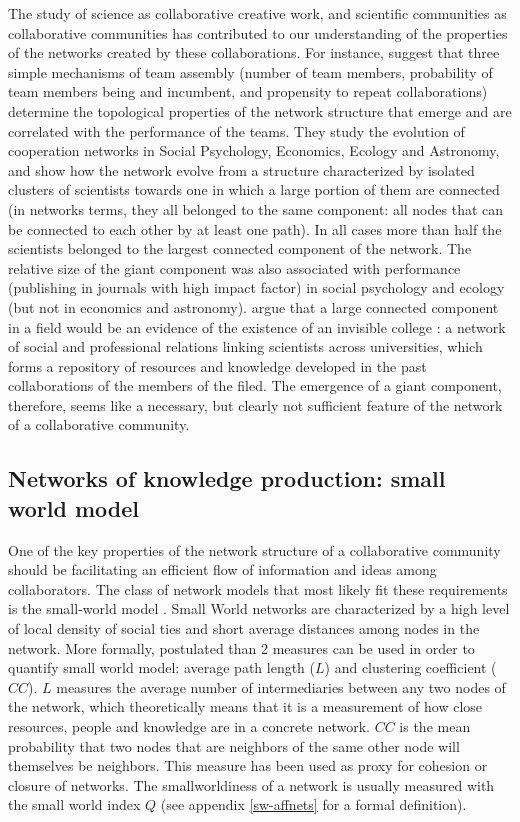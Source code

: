 The study of science as collaborative creative work, and scientific communities as collaborative communities has contributed to our understanding of the properties of the networks created by these collaborations. For instance, \citet{guimera:2005} suggest that three simple mechanisms of team assembly (number of team members, probability of team members being and incumbent, and propensity to repeat collaborations) determine the topological properties of the network structure that emerge and are correlated with the performance of the teams. They study the evolution of cooperation networks in Social Psychology, Economics, Ecology and Astronomy, and show how the network evolve from a structure characterized by isolated clusters of scientists towards one in which a large portion of them are connected (in networks terms, they all belonged to the same component: all nodes that can be connected to each other by at least one path). In all cases more than half the scientists belonged to the largest connected component of the network. The relative size of the giant component was also associated with performance (publishing in journals with high impact factor) in social psychology and ecology (but not in economics and astronomy). \citet{guimera:2005}  argue that a large connected component in a field would be an evidence of the existence of an invisible college \citep{solla:1986,merton:1979}: a network of social and professional relations linking scientists across universities, which forms a repository of resources and knowledge developed in the past collaborations of the members of the filed.  The emergence of a giant component, therefore, seems like a necessary, but clearly not sufficient feature of the network of a collaborative community.

\subsection{Networks of knowledge production: small world model}

One of the key properties of the network structure of a collaborative community should be facilitating an efficient flow of information and ideas among collaborators. The class of network models that most likely fit these requirements is the small-world model \citep{watts:1998}. Small World networks are characterized by a high level of local density of social ties and short average distances among nodes in the network. More formally,\citet{watts:1998} postulated than 2 measures can be used in order to quantify small world model: average path length ($L$) and clustering coefficient ($CC$). $L$ measures the average number of intermediaries between any two nodes of the network, which theoretically means that it is a measurement of how close resources, people and knowledge are in a concrete network. $CC$ is the mean probability that two nodes that are neighbors of the same other node will themselves be neighbors. This measure has been used as proxy for cohesion or closure of networks. The smallworldiness of a network is usually measured with the small world index $Q$ (see appendix \ref{sw-affnets} for a formal definition).

